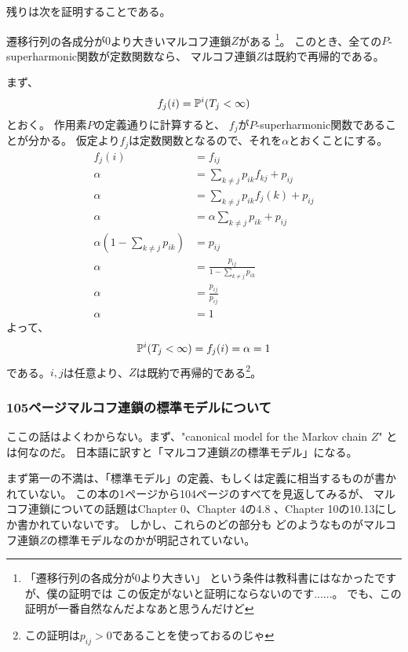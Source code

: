         残りは次を証明することである。
        \begin{center}
          遷移行列の各成分が$0$より大きいマルコフ連鎖$Z$がある
          \footnote{「遷移行列の各成分が$0$より大きい」
          という条件は教科書にはなかったですが、僕の証明では
          この仮定がないと証明にならないのです......。
          でも、この証明が一番自然なんだよなあと思うんだけど}。
          このとき、全ての$P$-superharmonic関数が定数関数なら、
          マルコフ連鎖$Z$は既約で再帰的である。
        \end{center}

        まず、
        \[
          f_j(i) = {\mathbb{P}}^i(T_j < \infty)
        \]
        とおく。
        作用素$P$の定義通りに計算すると、
        $f_j$が$P$-superharmonic関数であることが分かる。
        仮定より$f_j$は定数関数となるので、それを$\alpha$とおくことにする。
        \begin{align*}
          f_j(i) &= f_{ij}\\
          \alpha &= \sum_{k \neq j} p_{ik}f_{kj} + p_{ij}\\
          \alpha &= \sum_{k \neq j} p_{ik}f_j(k) + p_{ij}\\
          \alpha &= \alpha\sum_{k \neq j} p_{ik} + p_{ij}\\
          \alpha \left(1 - \sum_{k \neq j} p_{ik} \right) &= p_{ij}\\
          \alpha &= \frac{p_{ij}}{1 - \sum_{k \neq j} p_{ik}}\\
          \alpha &= \frac{p_{ij}}{p_{ij}}\\
          \alpha &= 1
        \end{align*}
        よって、
        \[
          {\mathbb{P}}^i(T_j < \infty) =f_{j}(i) = \alpha = 1
        \]
        である。$i,j$は任意より、$Z$は既約で再帰的である\footnote{この証明は$p_{ij} > 0$であることを使っておるのじゃ}。

      \subsubsection{105ページマルコフ連鎖の標準モデルについて}
        ここの話はよくわからない。まず、"canonical model for the Markov chain $Z$"
        とは何なのだ。
        日本語に訳すと「マルコフ連鎖$Z$の標準モデル」になる。

        まず第一の不満は、「標準モデル」の定義、もしくは定義に相当するものが書かれていない。
        この本の1ページから104ページのすべてを見返してみるが、
        マルコフ連鎖についての話題はChapter 0、Chapter 4の4.8
        、Chapter 10の10.13にしか書かれていないです。
        しかし、これらのどの部分も
        どのようなものがマルコフ連鎖$Z$の標準モデルなのかが明記されていない。

